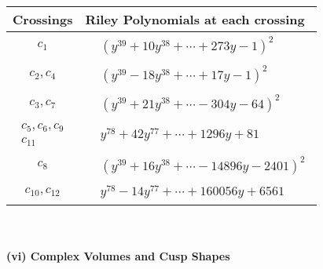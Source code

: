 \documentclass[1p]{elsarticle_modified}
\theoremstyle{definition}
\begin{document}
\begin{tabular}{m{50pt}|m{274pt}}
Crossings & \hspace{64pt}Riley Polynomials at each crossing \\
\hline $$\begin{aligned}c_{1}\end{aligned}$$&$\begin{aligned}
&(y^{39}+10 y^{38}+\cdots+273 y-1)^{2}
\end{aligned}$\\
\hline $$\begin{aligned}c_{2},c_{4}\end{aligned}$$&$\begin{aligned}
&(y^{39}-18 y^{38}+\cdots+17 y-1)^{2}
\end{aligned}$\\
\hline $$\begin{aligned}c_{3},c_{7}\end{aligned}$$&$\begin{aligned}
&(y^{39}+21 y^{38}+\cdots-304 y-64)^{2}
\end{aligned}$\\
\hline $$\begin{aligned}c_{5},c_{6},c_{9}\\c_{11}\end{aligned}$$&$\begin{aligned}
&y^{78}+42 y^{77}+\cdots+1296 y+81
\end{aligned}$\\
\hline $$\begin{aligned}c_{8}\end{aligned}$$&$\begin{aligned}
&(y^{39}+16 y^{38}+\cdots-14896 y-2401)^{2}
\end{aligned}$\\
\hline $$\begin{aligned}c_{10},c_{12}\end{aligned}$$&$\begin{aligned}
&y^{78}-14 y^{77}+\cdots+160056 y+6561
\end{aligned}$\\
\hline
\end{tabular}\\~\\
\newpage\flushleft \textbf{(vi) Complex Volumes and Cusp Shapes}
\end{document}
